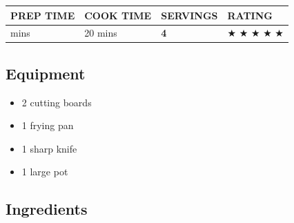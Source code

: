 \documentclass[
]{book}
\providecommand{\tightlist}{%
  \setlength{\itemsep}{0pt}\setlength{\parskip}{0pt}}
\begin{document}
\begin{longtable}[]{@{}llll@{}}
\toprule\noalign{}
\textbf{PREP TIME} & \textbf{COOK TIME} & \textbf{SERVINGS} &
\textbf{RATING} \\
\midrule\noalign{}
\endhead
\bottomrule\noalign{}
\endlastfoot
5 mins & 20 mins & \textbf{4} & ★ ★ ★ ★ ★ \\
\end{longtable}

\subsection*{Equipment}\label{equipment-4}

\begin{itemize}
\tightlist
\item
  2 cutting boards
\item
  1 frying pan
\item
  1 sharp knife
\item
  1 large pot
\end{itemize}

\subsection*{Ingredients}\label{ingredients-4}
\end{document}
